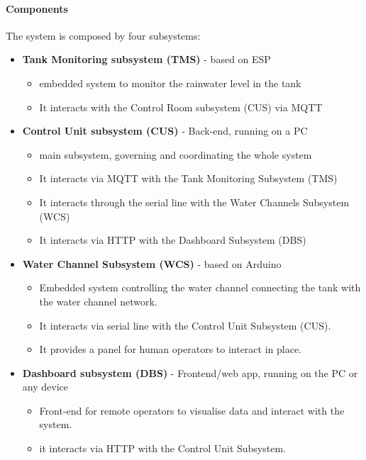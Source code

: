 \documentclass[12pt, letterpaper, twoside]{article}
\begin{document}
\paragraph*{Components}

The system is composed by four subsystems:

\begin{itemize}
    \item \textbf{Tank Monitoring subsystem (TMS)} - based on ESP
    \begin{itemize}
        \item embedded system to monitor the rainwater level in the tank
        \item It interacts with the Control Room subsystem (CUS) via MQTT
    \end{itemize}
    \item \textbf{Control Unit subsystem (CUS)}  - Back-end, running on a PC 
    \begin{itemize}
        \item main subsystem, governing and coordinating  the whole system
        \item It interacts via MQTT with the Tank Monitoring Subsystem (TMS)  
        \item It interacts through the serial line with the Water Channels Subsystem (WCS)  
        \item It interacts via HTTP with the Dashboard Subsystem (DBS) 
    \end{itemize}
    \item \textbf{Water Channel Subsystem (WCS)} - based on Arduino
    \begin{itemize}
        \item Embedded system controlling the water channel connecting the tank with the water channel network. 
        \item It interacts via serial line with the Control Unit Subsystem (CUS).
        \item It provides a panel for human operators to interact in place.
    \end{itemize}
    \item \textbf{Dashboard subsystem (DBS)} - Frontend/web app, running on the PC or any device
    \begin{itemize}
        \item Front-end for remote operators to visualise data and interact with the system.
        \item it interacts via HTTP with the Control Unit Subsystem.
    \end{itemize}
\end{itemize}
\end{document}
